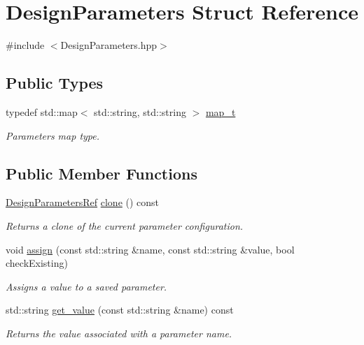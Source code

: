 \hypertarget{structDesignParameters}{}\section{Design\+Parameters Struct Reference}
\label{structDesignParameters}


{\ttfamily \#include $<$Design\+Parameters.\+hpp$>$}

\subsection*{Public Types}
\begin{DoxyCompactItemize}
\item 
typedef std\+::map$<$ std\+::string, std\+::string $>$ \hyperlink{structDesignParameters_abe27b44a8a6b5a2dd04e2f4b637823a0}{map\+\_\+t}
\begin{DoxyCompactList}\small\item\em Parameters map type. \end{DoxyCompactList}\end{DoxyCompactItemize}
\subsection*{Public Member Functions}
\begin{DoxyCompactItemize}
\item 
\hyperlink{DesignParameters_8hpp_ae36bb1c4c9150d0eeecfe1f96f42d157}{Design\+Parameters\+Ref} \hyperlink{structDesignParameters_a908a02002e611884c4b7af3a742460c8}{clone} () const
\begin{DoxyCompactList}\small\item\em Returns a clone of the current parameter configuration. \end{DoxyCompactList}\item 
void \hyperlink{structDesignParameters_ae60622dce36883cf97d3a644268aa685}{assign} (const std\+::string \&name, const std\+::string \&value, bool check\+Existing)
\begin{DoxyCompactList}\small\item\em Assigns a value to a saved parameter. \end{DoxyCompactList}\item 
std\+::string \hyperlink{structDesignParameters_a806361f8a2596f9f6dea7f73155dd871}{get\+\_\+value} (const std\+::string \&name) const
\begin{DoxyCompactList}\small\item\em Returns the value associated with a parameter name. \end{DoxyCompactList}\end{DoxyCompactItemize}
